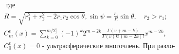 \documentclass[10pt]{article}
\begin{document}
\[\begin{aligned}
& \text { где } \\

& R=\sqrt{r_{1}^{2}+r_{2}^{2}-2 r_{1} r_{2} \cos \theta}, \sin \psi=\frac{r_{1}}{R} \sin \theta, \quad r_{2}>r_{1} ; \\

& C_{m}^{v}(x)=\sum_{k=0}^{m / 2]}(-1)^{k} 2^{m-2 k} \frac{\Gamma(v+m-k)}{\Gamma(v) k !(m-2 k) !} x^{m-2 k}, \\

& C_{0}^{v}(x)=0 \text { - ультрасферические многочлень. При разло- }

\end{aligned}

\]
\end{document}
